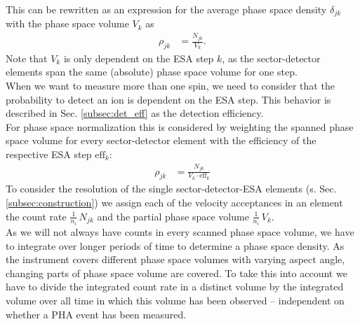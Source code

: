This can be rewritten as an expression for the average phase space density $\delta_{jk}$ with the phase space volume $V_{k}$ as 
\begin{align*}
\rho_{jk} &= \frac{N_{jk}}{V_{k}}.
\end{align*}
Note that $V_{k}$ is only dependent on the ESA step $k$, as the sector-detector elements span the same (absolute) phase space volume for one step.\\
When we want to measure more than one spin, we need to consider that the probability to detect an ion is dependent on the ESA step. This behavior is described in Sec. \ref{subsec:det_eff} as the detection efficiency.\\
For phase space normalization this is considered by weighting the spanned phase space volume for every sector-detector element with the efficiency of the respective ESA step $\mathrm{eff}_k$: 
\begin{align*}
\rho_{jk} &= \frac{N_{jk}}{V_{k}\cdot \mathrm{eff}_k}
\end{align*}
To consider the resolution of the single sector-detector-ESA elements (s. Sec. \ref{subsec:construction}) we assign each of the velocity acceptances in an element the count rate $\frac{1}{n_i}\, N_{jk}$ and the partial phase space volume $\frac{1}{n_i} \, V_{k}$.\\
As we will not always have counts in every scanned phase space volume, we have to integrate over longer periods of time to determine a phase space density.
As the instrument covers different phase space volumes with varying aspect angle, changing parts of phase space volume are covered. To take this into account we have to divide the integrated count rate in a distinct volume by the integrated volume over all time in which this volume has been observed -- independent on whether a PHA event has been measured.








